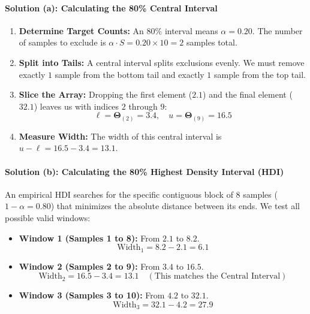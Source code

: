 \documentclass{article}
\begin{document}
\paragraph{Solution (a): Calculating the 80\% Central Interval}
\begin{enumerate}
    \item \textbf{Determine Target Counts:} An $80\%$ interval means $\alpha = 0.20$. The number of samples to exclude is $\alpha \cdot S = 0.20 \times 10 = 2$ samples total.
    \item \textbf{Split into Tails:} A central interval splits exclusions evenly. We must remove exactly $1$ sample from the bottom tail and exactly $1$ sample from the top tail.
    \item \textbf{Slice the Array:} Dropping the first element ($2.1$) and the final element ($32.1$) leaves us with indices $2$ through $9$:
    \begin{equation}
    \ell = \boldsymbol{\Theta}_{(2)} = 3.4, \quad u = \boldsymbol{\Theta}_{(9)} = 16.5
    \end{equation}
    \item \textbf{Measure Width:} The width of this central interval is $u - \ell = 16.5 - 3.4 = 13.1$.
\end{enumerate}

\paragraph{Solution (b): Calculating the 80\% Highest Density Interval (HDI)}
An empirical HDI searches for the specific contiguous block of $8$ samples ($1 - \alpha = 0.80$) that minimizes the absolute distance between its ends. We test all possible valid windows:

\begin{itemize}
    \item \textbf{Window 1 (Samples 1 to 8):} From $2.1$ to $8.2$.
    \begin{equation}
    \text{Width}_1 = 8.2 - 2.1 = 6.1
    \end{equation}
    \item \textbf{Window 2 (Samples 2 to 9):} From $3.4$ to $16.5$.
    \begin{equation}
    \text{Width}_2 = 16.5 - 3.4 = 13.1 \quad (\text{This matches the Central Interval})
    \end{equation}
    \item \textbf{Window 3 (Samples 3 to 10):} From $4.2$ to $32.1$.
    \begin{equation}
    \text{Width}_3 = 32.1 - 4.2 = 27.9
    \end{equation}
\end{itemize}
\end{document}
